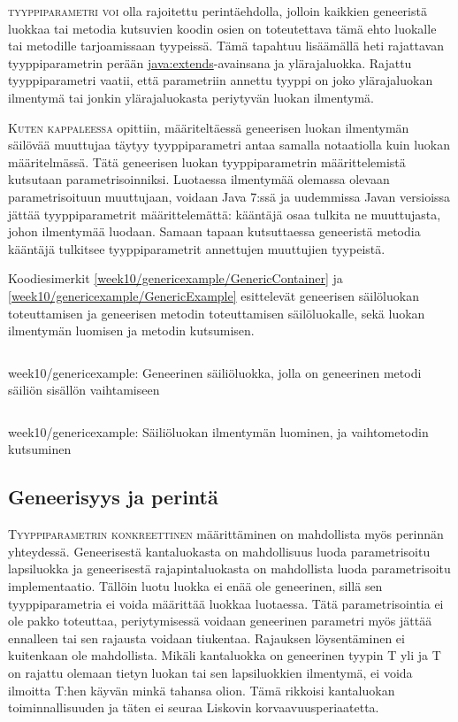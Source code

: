 \documentclass[openany]{book}
\newcommand{\newthought}[1]{\smallskip\textsc{#1}}
\newcommand{\java}[1]{\underline{\gls{java:#1}}}
\newcommand{\code}[3]{
	\begin{listing}
		\linespread{0.85}
		\inputminted{java}{OhjelmointiopasEsimerkit/src/#1/#2.java}
		\caption{#1: #3}
		\label{#1/#2}
	\end{listing}
}
\begin{document}
\newthought{\Gls{tyyppiparametri} voi} olla rajoitettu perintäehdolla, jolloin kaikkien
geneeristä luokkaa tai metodia kutsuvien koodin osien on toteutettava tämä ehto luokalle tai
metodille tarjoamissaan tyypeissä. Tämä tapahtuu lisäämällä heti rajattavan tyyppiparametrin
perään \java{extends}-avainsana ja ylärajaluokka. Rajattu tyyppiparametri vaatii, että parametriin
annettu tyyppi on joko ylärajaluokan ilmentymä tai jonkin ylärajaluokasta periytyvän luokan
ilmentymä.

\newthought{Kuten kappaleessa}  opittiin, määriteltäessä geneerisen luokan
ilmentymän säilövää muuttujaa täytyy tyyppiparametri antaa samalla notaatiolla kuin luokan
määritelmässä. Tätä geneerisen luokan tyyppiparametrin määrittelemistä kutsutaan
parametrisoinniksi. Luotaessa ilmentymää olemassa olevaan parametrisoituun muuttujaan, voidaan
Java 7:ssä ja uudemmissa Javan versioissa jättää tyyppiparametrit määrittelemättä: kääntäjä osaa
tulkita ne muuttujasta, johon ilmentymää luodaan. Samaan tapaan kutsuttaessa geneeristä metodia
kääntäjä tulkitsee tyyppiparametrit annettujen muuttujien tyypeistä.

Koodiesimerkit \ref{week10/genericexample/GenericContainer} ja
\ref{week10/genericexample/GenericExample} esittelevät geneerisen säilöluokan toteuttamisen ja
geneerisen metodin toteuttamisen säilöluokalle, sekä luokan ilmentymän luomisen ja metodin
kutsumisen.

\code{week10/genericexample}{GenericContainer}{Geneerinen säiliöluokka, jolla on geneerinen metodi
säiliön sisällön vaihtamiseen}
\code{week10/genericexample}{GenericExample}{Säiliöluokan ilmentymän luominen, ja vaihtometodin
kutsuminen}

\subsection{Geneerisyys ja perintä}
\label{genericInheritance}

\newthought{Tyyppiparametrin konkreettinen} määrittäminen on mahdollista myös perinnän yhteydessä.
Geneerisestä kantaluokasta on mahdollisuus luoda parametrisoitu lapsiluokka ja geneerisestä
rajapintaluokasta on mahdollista luoda parametrisoitu implementaatio. Tällöin luotu luokka
ei enää ole geneerinen, sillä sen tyyppiparametria ei voida määrittää luokkaa luotaessa. Tätä
parametrisointia ei ole pakko toteuttaa, periytymisessä voidaan geneerinen parametri myös
jättää ennalleen tai sen rajausta voidaan tiukentaa. Rajauksen löysentäminen ei kuitenkaan ole
mahdollista. Mikäli kantaluokka on geneerinen tyypin T yli ja T on rajattu olemaan tietyn luokan
tai sen lapsiluokkien ilmentymä, ei voida ilmoitta T:hen käyvän minkä tahansa olion. Tämä rikkoisi
kantaluokan toiminnallisuuden ja täten ei seuraa \gls{Liskovin korvaavuusperiaate}tta.
\end{document}
